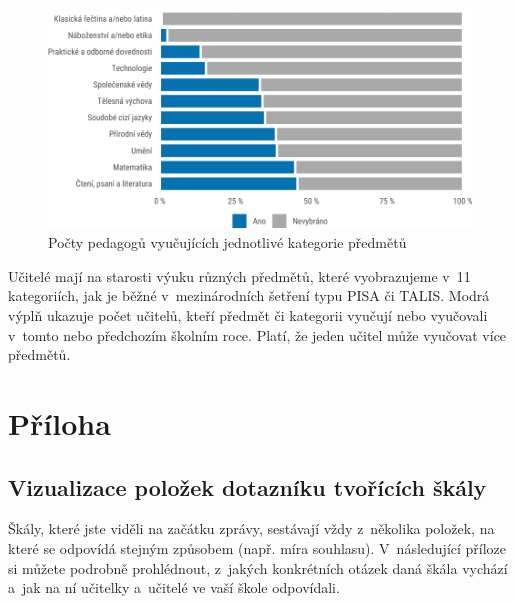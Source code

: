 \documentclass[12pt,a4paper,]{report}
\begin{document}
\begin{figure}

{\centering \includegraphics[width=\textwidth]{figs/subjects-1} 

}

\caption{Počty pedagogů vyučujících jednotlivé kategorie předmětů}\label{fig:subjects}
\end{figure}

Učitelé mají na starosti výuku různých předmětů, které vyobrazujeme v~11 kategoriích, jak je běžné v~mezinárodních šetření typu PISA či TALIS. Modrá výplň ukazuje počet učitelů, kteří předmět či kategorii vyučují nebo vyučovali v~tomto nebo předchozím školním roce. Platí, že jeden učitel může vyučovat více předmětů.

\newpage

\hypertarget{pux159uxedloha}{%
\chapter{Příloha}\label{pux159uxedloha}}

\hypertarget{vizualizace-poloux17eek-dotaznuxedku-tvoux159uxedcuxedch-ux161kuxe1ly}{%
\section{Vizualizace položek dotazníku tvořících škály}\label{vizualizace-poloux17eek-dotaznuxedku-tvoux159uxedcuxedch-ux161kuxe1ly}}

Škály, které jste viděli na začátku zprávy, sestávají vždy z~několika položek, na které se odpovídá stejným způsobem (např. míra souhlasu). V~následující příloze si můžete podrobně prohlédnout, z~jakých konkrétních otázek daná škála vychází a~jak na ní učitelky a~učitelé ve vaší škole odpovídali.
\end{document}
